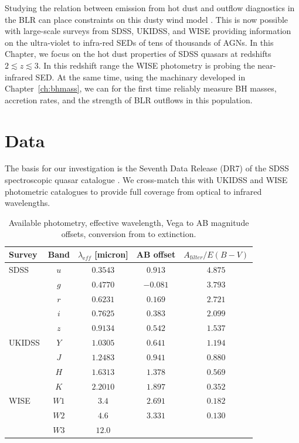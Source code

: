 Studying the relation between emission from hot dust and outflow diagnostics in the BLR can place constraints on this dusty wind model \citep[e.g.][]{wang13}. 
This is now possible with large-scale surveys from SDSS, UKIDSS, and WISE providing information on the ultra-violet to infra-red SEDs of tens of thousands of AGNs. 
In this Chapter, we focus on the hot dust properties of SDSS quasars at redshifts $2\lesssim z \lesssim3$. 
In this redshift range the WISE photometry is probing the near-infrared SED. 
At the same time, using the machinary developed in Chapter~\ref{ch:bhmass}, we can for the first time reliably measure BH masses, accretion rates, and the strength of BLR outflows in this population. 

\section{Data}

The basis for our investigation is the Seventh Data Release (DR7) of the SDSS spectroscopic quasar catalogue \citep{schneider10}.
We cross-match this with UKIDSS and WISE photometric catalogues to provide full coverage from optical to infrared wavelengths.   

\begin{table}
  \footnotesize
  \centering
  \begin{tabular}{lcccc}
    \hline 
    Survey & Band & $\lambda_{\mathrm eff}$ [micron] & AB offset & $A_{\mathrm filter}/E(B-V)$ \\
    \hline 
    SDSS & $u$ & $0.3543$ & $ 0.913$ & $4.875$ \\
         & $g$ & $0.4770$ & $-0.081$ & $3.793$ \\
         & $r$ & $0.6231$ & $ 0.169$ & $2.721$ \\
         & $i$ & $0.7625$ & $ 0.383$ & $2.099$ \\
         & $z$ & $0.9134$ & $ 0.542$ & $1.537$ \\
    UKIDSS & $Y$ & $1.0305$ &  $0.641$ & $1.194$ \\
           & $J$ & $1.2483$ &  $0.941$ & $0.880$ \\
           & $H$ & $1.6313$ &  $1.378$ & $0.569$ \\
           & $K$ & $2.2010$ &  $1.897$ & $0.352$ \\
    WISE & $W1$ & $3.4$ & $2.691$ & $0.182$\\
         & $W2$ & $4.6$ & $3.331$ & $0.130$\\
         & $W3$ & $12.0$ & & \\           
    \hline
  \end{tabular}
  \caption[{Available photometry, effective wavelength, Vega to AB magnitude offsets, conversion from \ebv to extinction.}]{Available photometry, effective wavelength, Vega to AB magnitude offsets, conversion from \ebv to extinction. }
  \label{tab:photometry}
\end{table}

